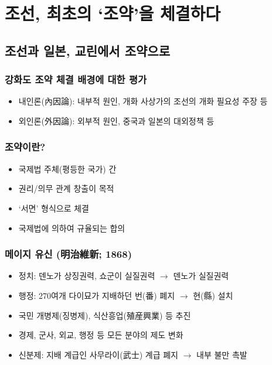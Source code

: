 \section{조선, 최초의 `조약'을 체결하다}

\subsection{조선과 일본, 교린에서 조약으로}

\subsubsection*{강화도 조약 체결 배경에 대한 평가}
\begin{itemize}
    \item 내인론(內因論): 내부적 원인, 개화 사상가의 조선의 개화 필요성 주장 등
    \item 외인론(外因論): 외부적 원인, 중국과 일본의 대외정책 등
\end{itemize}

\subsubsection*{조약이란?}
\begin{itemize}
    \item 국제법 주체(평등한 국가) 간
    \item 권리/의무 관계 창출이 목적
    \item `서면' 형식으로 체결
    \item 국제법에 의하여 규율되는 합의
\end{itemize}

\subsubsection*{메이지 유신 (明治維新; 1868)}
\begin{itemize}
    \item 정치: 덴노가 상징권력, 쇼군이 실질권력 $\rightarrow$ 덴노가 실질권력
    \item 행정: 270여개 다이묘가 지배하던 번(番) 폐지 $\rightarrow$ 현(縣) 설치
    \item 국민 개병제(징병제), 식산흥업(殖産興業) 등 추진
    \item 경제, 군사, 외교, 행정 등 모든 분야의 제도 변화
    \item 신분제: 지배 계급인 사무라이(武士) 계급 폐지 $\rightarrow$ 내부 불만 촉발
\end{itemize}

